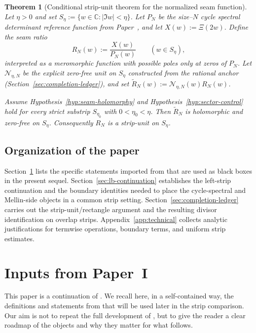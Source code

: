 \documentclass[11pt]{amsart}
\newtheorem{theorem}{Theorem}[section]
\theoremstyle{definition}
\theoremstyle{remark}
\begin{document}
\begin{theorem}[Conditional strip-unit theorem for the normalized seam function]\label{thm:strip-unit}
Let $\eta>0$ and set $S_\eta:=\{w\in\mathbb C:|\Im w|<\eta\}$.  Let $P_N$ be the size--$N$
cycle spectral determinant reference function from Paper~\cite{PaperI}, and let $X(w):=\Xi(2w)$.
Define the seam ratio
\[
R_N(w):=\frac{X(w)}{P_N(w)}\qquad (w\in S_\eta),
\]
interpreted as a meromorphic function with possible poles only at zeros of $P_N$.
Let $\mathcal N_{\eta,N}$ be the explicit zero-free unit on $S_\eta$ constructed from the rational
anchor (Section~\ref{sec:completion-ledger}), and set $\widetilde R_N(w):=\mathcal N_{\eta,N}(w)R_N(w)$.

Assume Hypothesis~\ref{hyp:seam-holomorphy} and Hypothesis~\ref{hyp:sector-control} hold for every strict
substrip $S_{\eta_0}$ with $0<\eta_0<\eta$.  Then $\widetilde R_N$ is holomorphic and zero-free on
$S_\eta$.  Consequently $R_N$ is a strip-unit on $S_\eta$.
\end{theorem}


\subsection{Organization of the paper}
Section~\ref{sec:inputs-from-I} lists the specific statements imported from \cite{PaperI} that are
used as black boxes in the present sequel.
Section~\ref{sec:lb-continuation} establishes the left-strip continuation and the boundary identities
needed to place the cycle-spectral and Mellin-side objects in a common strip setting.
Section~\ref{sec:completion-ledger} carries out the strip-unit/rectangle argument and the resulting
divisor identification on overlap strips.
Appendix~\ref{app:technical} collects analytic justifications for termwise operations, boundary terms,
and uniform strip estimates.

\section{Inputs from Paper~I}
\label{sec:inputs-from-I}

This paper is a continuation of \cite{PaperI}.  We recall here, in a self-contained way, the
definitions and statements from \cite{PaperI} that will be used later in the strip comparison.
Our aim is not to repeat the full development of \cite{PaperI}, but to give the reader a clear
roadmap of the objects and why they matter for what follows.
\end{document}
